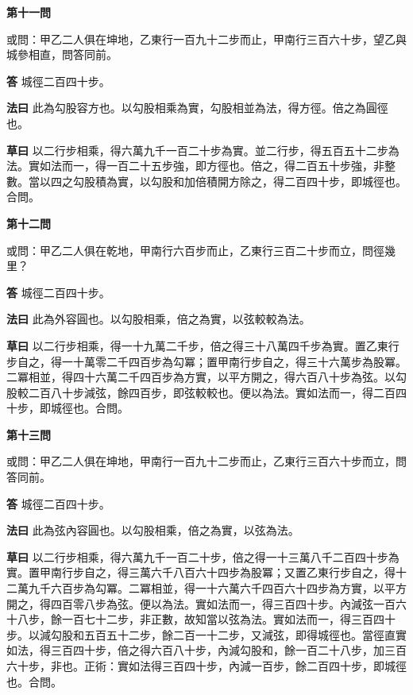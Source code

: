 \documentclass[11pt,a4paper]{article}
\newcommand{\problem}[1]{\par\noindent\textbf{\color{problemcolor}#1}\par\nopagebreak}
\newcommand{\answer}[1]{\par\noindent\textbf{答} #1\par}
\newcommand{\method}[1]{\par\noindent\textbf{法曰} #1\par}
\newcommand{\workings}[1]{\par\noindent\textbf{草曰} #1\par}
\begin{document}
\vspace{0.5cm}

\problem{第十一問}

\noindent 或問：甲乙二人俱在坤地，乙東行一百九十二步而止，甲南行三百六十步，望乙與城參相直，問答同前。

\answer{城徑二百四十步。}

\method{此為勾股容方也。以勾股相乘為實，勾股相並為法，得方徑。倍之為圓徑也。}

\workings{以二行步相乘，得六萬九千一百二十步為實。並二行步，得五百五十二步為法。實如法而一，得一百二十五步強，即方徑也。倍之，得二百五十步強，非整數。當以四之勾股積為實，以勾股和加倍積開方除之，得二百四十步，即城徑也。合問。}

\vspace{0.5cm}

\problem{第十二問}

\noindent 或問：甲乙二人俱在乾地，甲南行六百步而止，乙東行三百二十步而立，問徑幾里？

\answer{城徑二百四十步。}

\method{此為外容圓也。以勾股相乘，倍之為實，以弦較較為法。}

\workings{以二行步相乘，得一十九萬二千步，倍之得三十八萬四千步為實。置乙東行步自之，得一十萬零二千四百步為勾冪；置甲南行步自之，得三十六萬步為股冪。二冪相並，得四十六萬二千四百步為方實，以平方開之，得六百八十步為弦。以勾股較二百八十步減弦，餘四百步，即弦較較也。便以為法。實如法而一，得二百四十步，即城徑也。合問。}

\vspace{0.5cm}

\problem{第十三問}

\noindent 或問：甲乙二人俱在坤地，甲南行一百九十二步而止，乙東行三百六十步而立，問答同前。

\answer{城徑二百四十步。}

\method{此為弦內容圓也。以勾股相乘，倍之為實，以弦為法。}

\workings{以二行步相乘，得六萬九千一百二十步，倍之得一十三萬八千二百四十步為實。置甲南行步自之，得三萬六千八百六十四步為股冪；又置乙東行步自之，得十二萬九千六百步為勾冪。二冪相並，得一十六萬六千四百六十四步為方實，以平方開之，得四百零八步為弦。便以為法。實如法而一，得三百四十步。內減弦一百六十八步，餘一百七十二步，非正數，故知當以弦為法。實如法而一，得三百四十步。以減勾股和五百五十二步，餘二百一十二步，又減弦，即得城徑也。當徑直實如法，得三百四十步，倍之得六百八十步，內減勾股和，餘一百二十八步，加三百六十步，非也。正術：實如法得三百四十步，內減一百步，餘二百四十步，即城徑也。合問。}
\end{document}
